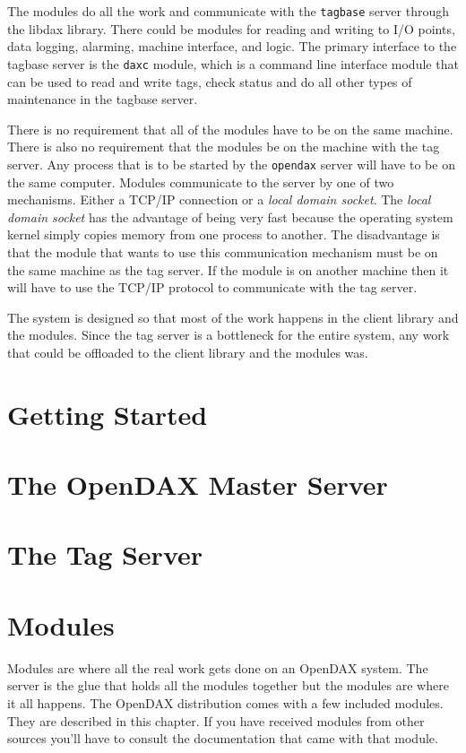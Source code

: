 The modules do all the work and communicate with the \texttt{tagbase} server through the libdax library. There could be modules for reading and writing to I/O points, data logging, alarming, machine interface, and logic. The primary interface to the tagbase server is the \texttt{daxc} module, which is a command line interface module that can
be used to read and write tags, check status and do all other types of maintenance in the tagbase server.

There is no requirement that all of the modules have to be on the same machine.  There is also no requirement that the modules be on the machine with the tag server.  Any process that is to be started by the \texttt{opendax} server will have to be on the same computer.  Modules communicate to the server by one of two mechanisms.  Either a TCP/IP connection or a \textit{local domain socket}.  The \textit{local domain socket} has the advantage of being very fast because the operating system kernel simply copies memory from one process to another.  The disadvantage is that the module that wants to use this communication mechanism must be on the same machine as the tag server. If the module is on another machine then it will have to use the TCP/IP protocol to communicate with the tag server.

The system is designed so that most of the work happens in the client library and the modules.  Since the tag
server is a bottleneck for the entire system, any work that could be offloaded to the client library and the
modules was.

\chapter{Getting Started}


\chapter{The OpenDAX Master Server}


\chapter{The Tag Server}


\chapter{Modules}
Modules are where all the real work gets done on an OpenDAX system.  The server is the glue that holds all the modules together but the modules are where it all happens.  The OpenDAX distribution comes with a few included modules.  They are described in this chapter.  If you have received modules from other sources you'll have to consult the documentation that came with that module.

